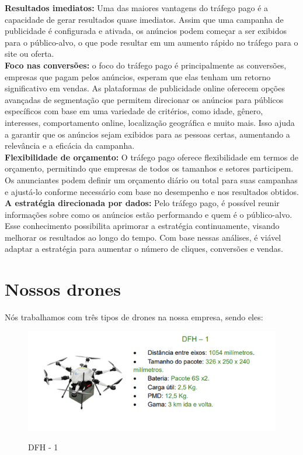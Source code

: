 \textbf{Resultados imediatos:} Uma das maiores vantagens do tráfego pago é a capacidade de gerar resultados quase imediatos. Assim que uma campanha de publicidade é configurada e ativada, os anúncios podem começar a ser exibidos para o público-alvo, o que pode resultar em um aumento rápido no tráfego para o site ou oferta.\\

\textbf{Foco nas conversões:} o foco do tráfego pago é principalmente as conversões, empresas que pagam pelos anúncios, esperam que elas tenham um retorno significativo em vendas. As plataformas de publicidade online oferecem opções avançadas de segmentação que permitem direcionar os anúncios para públicos específicos com base em uma variedade de critérios, como idade, gênero, interesses, comportamento online, localização geográfica e muito mais. Isso ajuda a garantir que os anúncios sejam exibidos para as pessoas certas, aumentando a relevância e a eficácia da campanha.\\

\textbf{Flexibilidade de orçamento:} O tráfego pago oferece flexibilidade em termos de orçamento, permitindo que empresas de todos os tamanhos e setores participem. Os anunciantes podem definir um orçamento diário ou total para suas campanhas e ajustá-lo conforme necessário com base no desempenho e nos resultados obtidos.\\

\textbf{A estratégia direcionada por dados:} Pelo tráfego pago, é possível reunir informações sobre como os anúncios estão performando e quem é o público-alvo. Esse conhecimento possibilita aprimorar a estratégia continuamente, visando melhorar os resultados ao longo do tempo. Com base nessas análises, é viável adaptar a estratégia para aumentar o número de cliques, conversões e vendas\cite{Semrush2023}.

\section{Nossos drones}

Nós trabalhamos com três tipos de drones na nossa empresa, sendo eles:

\begin{figure} [!ht]
   {\centering
    \caption{DFH - 1}
    \includegraphics[width=0.9\linewidth]{figuras/drone dfh1.png}
    \label{fig:enter-label}
    }
\end{figure}

